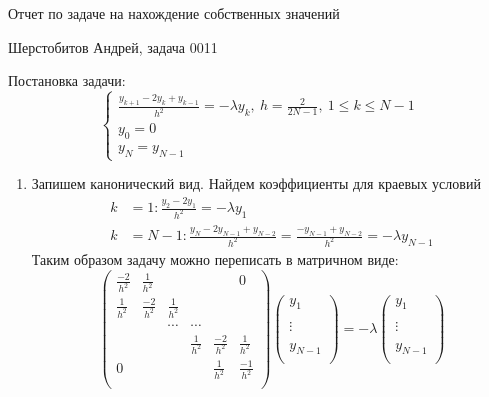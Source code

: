 \documentclass[12pt]{article}
\begin{document}
\begin{center}
Отчет по задаче на нахождение собственных значений
\end{center}
\begin{center}
Шерстобитов Андрей, задача 0011
\end{center}
Постановка задачи:
\[\begin{cases}
    \frac{y_{k+1}-2y_k+y_{k-1}}{h^2} = -\lambda y_k,\ h = \frac{2}{2N-1},\ 1 \leq k \leq N-1 \\
    y_0 = 0 \\
    y_N = y_{N-1}
\end{cases}\]
\begin{enumerate}
    \item Запишем канонический вид. Найдем коэффициенты для краевых условий
    \begin{align*}
        k &= 1: \frac{y_2 - 2y_1}{h^2} = -\lambda y_1 \\
        k &= N-1: \frac{y_N - 2y_{N-1}+y_{N-2}}{h^2} = \frac{-y_{N-1} + y_{N-2}}{h^2} = -\lambda y_{N-1}
    \end{align*}
    Таким образом задачу можно переписать в матричном виде:
    \[\left(\begin{array}{cccccc}
        \frac{-2}{h^2}& \frac{1}{h^2}  &&&& 0 \\
        \frac{1}{h^2} & \frac{-2}{h^2} & \frac{1}{h^2} &&& \\
        &&\cdots&\cdots&& \\
        &&& \frac{1}{h^2} & \frac{-2}{h^2} & \frac{1}{h^2} \\
        0 &&&               & \frac{1}{h^2}  & \frac{-1}{h^2} \\
    \end{array}\right)
    \left(\begin{array}{c}
        y_{1}\\
        \\
        \vdots\\
        \\
        y_{N-1}\\
    \end{array}\right)
    =
    -\lambda
    \left(\begin{array}{c}
        y_{1}\\
        \\
        \vdots\\
        \\
        y_{N-1}\\
    \end{array}\right)
    \]


\end{enumerate}
\end{document}

